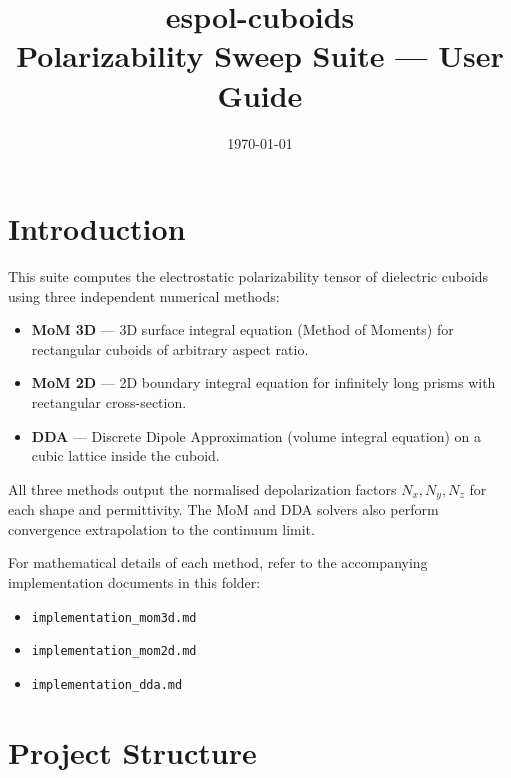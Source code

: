 \documentclass[a4paper,11pt]{article}
\title{espol-cuboids \\ Polarizability Sweep Suite --- User Guide}
\author{}
\date{\today}
\begin{document}
\maketitle
\tableofcontents
\newpage

\section{Introduction}

This suite computes the electrostatic polarizability tensor of dielectric
cuboids using three independent numerical methods:
%
\begin{itemize}
    \item \textbf{MoM 3D} — 3D surface integral equation (Method of Moments)
          for rectangular cuboids of arbitrary aspect ratio.
    \item \textbf{MoM 2D} — 2D boundary integral equation for infinitely long
          prisms with rectangular cross-section.
    \item \textbf{DDA} — Discrete Dipole Approximation (volume integral
          equation) on a cubic lattice inside the cuboid.
\end{itemize}
%
All three methods output the normalised depolarization factors
\(N_x, N_y, N_z\) for each shape and permittivity.  The MoM and DDA solvers
also perform convergence extrapolation to the continuum limit.

For mathematical details of each method, refer to the accompanying
implementation documents in this folder:
%
\begin{itemize}
    \item \texttt{implementation\_mom3d.md}
    \item \texttt{implementation\_mom2d.md}
    \item \texttt{implementation\_dda.md}
\end{itemize}

\section{Project Structure}
\end{document}
